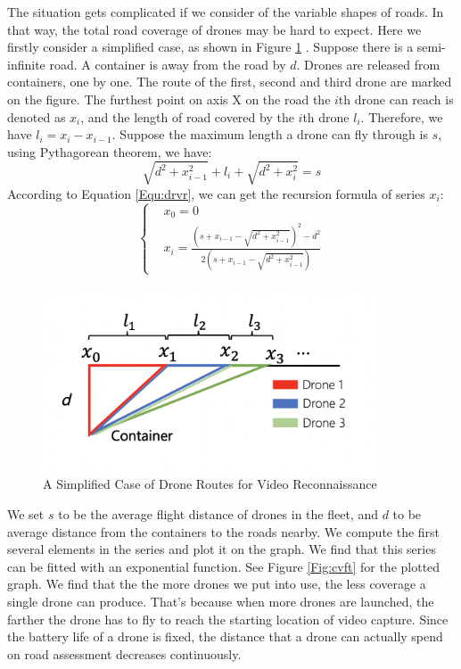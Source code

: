 \documentclass{mcmthesis}
\begin{document}
The situation gets complicated if we consider of the variable shapes of roads. In that way, the total road coverage of drones may be hard to expect. Here we firstly consider a simplified case, as shown in Figure \ref{Fig:vdsr} . Suppose there is a semi-infinite road. A container is away from the road by $d$. Drones are released from containers, one by one. The route of the first, second and third drone are marked on the figure. The furthest point on axis X on the road the $i$th drone can reach is denoted as $x_i$, and the length of road covered by the $i$th drone $l_i$. Therefore, we have $l_i=x_i-x_{i-1}$. Suppose the maximum length a drone can fly through is $s$, using Pythagorean theorem, we have:
\begin{equation}
    \sqrt{d^2+x_{i-1}^2} + l_i + \sqrt{d^2+x_i^2} = s
    \label{Equ:drvr}
\end{equation}
According to Equation \eqref{Equ:drvr}, we can get the recursion formula of series $x_i$:
\begin{equation}
    \left\{
    \begin{aligned}
    &x_0 = 0 \\
    &x_i = \frac{(s + x_{i-1} - \sqrt{d^2 + x_{i-1}^2})^2 - d^2}{2(s + x_{i-1} - \sqrt{d^2 + x_{i-1}^2})}
    \end{aligned}
    \right.
\end{equation}

\begin{figure}[htbp]
    \centering
    \includegraphics[width=10cm]{figures/video_drone_path.png}
    \caption{A Simplified Case of Drone Routes for Video Reconnaissance}
    \label{Fig:vdsr}
\end{figure}

We set $s$ to be the average flight distance of drones in the fleet, and $d$ to be average distance from the containers to the roads nearby. We compute the first several elements in the series and plot it on the graph. We find that this series can be fitted with an exponential function. See Figure \ref{Fig:cvft} for the plotted graph. We find that the the more drones we put into use, the less coverage a single drone can produce. That's because when more drones are launched, the farther the drone has to fly to reach the starting location of video capture. Since the battery life of a drone is fixed, the distance that a drone can actually spend on road assessment decreases continuously. 
\end{document}
